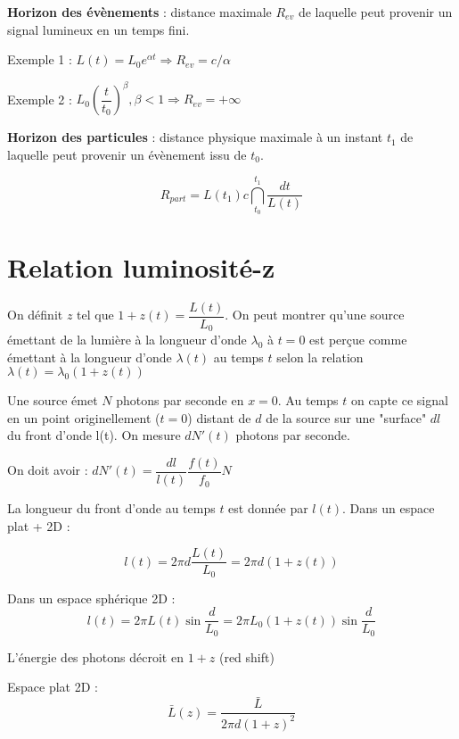 \documentclass[11pt]{article} %
\begin{document}
\textbf{Horizon des évènements} : distance maximale $R_{ev}$ de laquelle peut provenir un signal lumineux en un temps fini.

Exemple 1 : $L(t) = L_0 e^{\alpha t} \Rightarrow R_{ev} = c/\alpha$

Exemple 2 : $L_0 \left ( \dfrac{t}{t_0} \right )^\beta, \beta < 1 \Rightarrow R_{ev} = +\infty$

\textbf{Horizon des particules} : distance physique maximale à un instant $t_1$ de laquelle peut provenir un évènement issu de $t_0$.

\begin{equation}
R_{part} = L(t_1) c \dint_{t_0}^{t_1} \dfrac{dt}{L(t)}
\end{equation}

\section{Relation luminosité-z}

On définit $z$ tel que $1+z(t) = \dfrac{L(t)}{L_0}$.
On peut montrer qu'une source émettant de la lumière à la longueur d'onde $\lambda_0$ à $t=0$ est perçue comme émettant à la longueur d'onde $\lambda(t)$ au temps $t$ selon la relation $\lambda (t) = \lambda_0 (1+z(t))$

Une source émet $N$ photons par seconde en $x = 0$. Au temps $t$ on capte ce signal en un point originellement ($t = 0$) distant de $d$ de la source sur une "surface" $dl$ du front d'onde l(t). On mesure $dN'(t)$ photons par seconde.

On doit avoir :
$dN'(t) = \dfrac{dl}{l(t)} \dfrac{f(t)}{f_0} N$


La longueur du front d'onde au temps $t$ est donnée par $l(t)$. Dans un espace plat + 2D :

\begin{equation}
l(t) = 2\pi d \dfrac{L(t)}{L_0} = 2\pi d (1+z(t)) 
\end{equation}

Dans un espace sphérique 2D :
\begin{equation}
l(t) = 2\pi L(t) \sin \dfrac{d}{L_0} = 2\pi L_0 (1+z(t)) \sin \dfrac{d}{L_0} 
\end{equation}

L'énergie des photons décroit en $1+z$ (red shift) 

Espace plat 2D : 
\begin{equation}
\bar{L} (z) = \dfrac{\bar{L}}{2\pi d(1+z)^2}
\end{equation}
\end{document}
